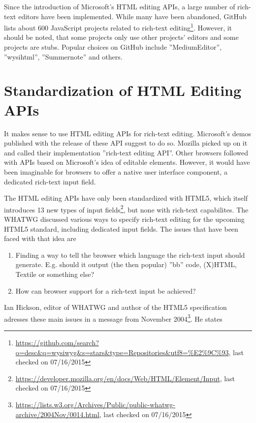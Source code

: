 Since the introduction of Microsoft's HTML editing APIs, a large number of rich-text editors have been implemented. While many have been abandoned, GitHub lists about 600 JavaScript projects related to rich-text editing\footnote{\url{https://github.com/search?o=desc\&q=wysiwyg\&s=stars\&type=Repositories\&utf8=\%E2\%9C\%93}, last checked on 07/16/2015}. However, it should be noted, that some projects only use other projects' editors and some projects are stubs. Popular choices on GitHub include ''MediumEditor'', ''wysihtml'', ''Summernote'' and others.

\section{Standardization of HTML Editing APIs}
\label{sec:standardization-of-html-editing-apis}

It makes sense to use HTML editing APIs for rich-text editing. Microsoft's demos published with the release of these API suggest to do so. Mozilla picked up on it and called their implementation ''rich-text editing API''. Other browsers followed with APIs based on Microsoft's idea of editable elements. However, it would have been imaginable for browsers to offer a native user interface component, a dedicated rich-text input field.

The HTML editing APIs have only been standardized with HTML5, which itself introduces 13 new types of input fields\footnote{\url{https://developer.mozilla.org/en/docs/Web/HTML/Element/Input}, last checked on 07/16/2015}, but none with rich-text capabilites. The WHATWG discussed various ways to specify rich-text editing for the upcoming HTML5 standard, including dedicated input fields. The issues that have been faced with that idea are 

\begin{enumerate} 
\item Finding a way to tell the browser which language the rich-text input should generate. E.g. should it output (the then popular) ''bb'' code, (X)HTML, Textile or something else?
\item How can browser support for a rich-text input be achieved?
\end{enumerate}


Ian Hickson, editor of WHATWG and author of the HTML5 specification adresses these main issues in a message from November 2004\footnote{\url{https://lists.w3.org/Archives/Public/public-whatwg-archive/2004Nov/0014.html}, last checked on 07/16/2015}. He states

